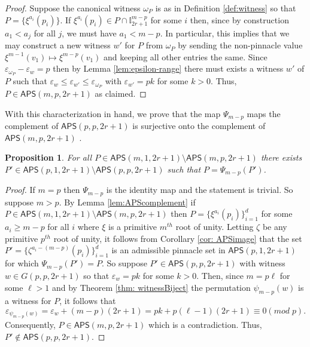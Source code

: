 \documentclass[12pt,reqno]{amsart}
\numberwithin{equation}{section}
\theoremstyle{plain}
\newtheorem{proposition}[theorem]{Proposition}
\theoremstyle{definition}
\theoremstyle{remark}
\newcommand{\I}{\mathbb{I}}
\newcommand\APS{\mathsf{APS}}
\begin{document}
\begin{proof}
    Suppose the canonical witness $\omega_P$ is as in Definition \ref{def:witness} so that $P = \{\xi^{a_i}(p_i)\}$. If $\xi^{a_i}(p_i) \in P \cap \I^{m-p}_{2r+1} $ for some $i$ then, since by construction $a_1<a_j$ for all $j$, we must have $a_1<m-p$. In particular, this implies that we may construct a new witness $w'$ for $P$ from $\omega_P$ by sending the non-pinnacle value $\xi^{m-1}(v_1) \mapsto \xi^{m-p}(v_1)$ and keeping all other entries the same. Since $\varepsilon_{\omega_P} - \varepsilon_w = p$ then by Lemma \ref{lem:epsilon-range} there must exists a witness $w'$ of $P$ such that 
    $\varepsilon_w\leq \varepsilon_{w'}\leq \varepsilon_{\omega_P}$ with $\varepsilon_{w'}=pk$ for some $k>0$. Thus, $P \in \APS(m,p,2r+1)$ as claimed.
\end{proof}

With this characterization in hand, we prove that the map $\Psi_{m-p}$ maps the complement of 
$\APS(p,p,2r+1)$ is surjective onto the complement of $\APS(m,p,2r+1)$ .

\begin{proposition}\label{prop:odd-reduction1} 
    For all $P \in \APS(m,1,2r+1) \setminus \APS(m,p,2r+1)$ there exists $P'  \in \APS(p,1,2r+1) \setminus \APS(p,p,2r+1)$ such that $P = \Psi_{m-p}(P')$.
\end{proposition}

\begin{proof}
If $m=p$ then $\Psi_{m-p}$ is the identity map and the statement is trivial. So suppose $m>p$.
    By Lemma \ref{lem:APScomplement} if $P \in \APS(m,1,2r+1) \setminus \APS(m,p,2r+1)$ then $P = \{ \xi^{a_i}(p_i)\}_{i=1}^d$ for some $a_i\geq m-p$ for all $i$ where $\xi$ is a primitive $m^{th}$ root of unity. Letting $\zeta$ be any primitive $p^{th}$ root of unity, it follows from Corollary \ref{cor: APSimage} that the set $P' = \{ \zeta^{a_i-(m-p)}(p_i)\}_{i=1}^d$ is an admissible pinnacle set in $\APS(p,1,2r+1)$ for which $\Psi_{m-p}(P')=P$.
 So suppose $P' \in \APS(p,p,2r+1)$ with witness $w \in G(p,p,2r+1)$ so that $\varepsilon_w = pk$ for some $k>0$. Then, since $m=p\ell$ for some $\ell>1$ and by Theorem \ref{thm: witnessBiject} the permutation $\psi_{m-p}(w)$ is a witness for $P$, it follows that
 \[
\varepsilon_{\psi_{m-p}(w)} = \varepsilon_w +(m-p)(2r+1) = pk+p(\ell-1)(2r+1) \equiv 0 (mod \; p).
 \]
 Consequently, $P \in \APS(m,p,2r+1)$ which is a contradiction. Thus, $P'  \notin \APS(p,p,2r+1)$.
\end{proof}
\end{document}
